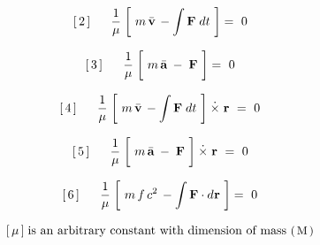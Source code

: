 \documentclass[10pt,fleqn]{article}
\begin{document}
\par \vspace{+0.15em}
\begin{eqnarray*}
\hspace{+1.35em} [\,2\,] \;\;\;\;\;\; \dfrac{1}{\mu} \; \bigg [ \,\, m \, \bar{\mathbf{v}} \, - \int \mathbf{F} \; d\hspace{+0.012em}t \,\, \bigg ] =~ 0
\end{eqnarray*}
\par \vspace{+0.15em}
\begin{eqnarray*}
\hspace{+1.35em} [\,3\,] \;\;\;\;\;\; \dfrac{1}{\mu} \; \bigg [ \,\, m \, \bar{\mathbf{a}} \: - \; \mathbf{F} \,\, \bigg ] =~ 0
\end{eqnarray*}
\par \vspace{+0.15em}
\begin{eqnarray*}
\hspace{+1.35em} [\,4\,] \;\;\;\;\;\; \dfrac{1}{\mu} \; \bigg [ \,\, m \, \bar{\mathbf{v}} \, - \int \mathbf{F} \; d\hspace{+0.012em}t \,\, \bigg ] \hspace{+0.24em}\dot{\times}\hspace{+0.30em} \mathbf{r} ~=~ 0
\end{eqnarray*}
\par \vspace{+0.15em}
\begin{eqnarray*}
\hspace{+1.35em} [\,5\,] \;\;\;\;\;\; \dfrac{1}{\mu} \; \bigg [ \,\, m \, \bar{\mathbf{a}} \: - \; \mathbf{F} \,\, \bigg ] \hspace{+0.24em}\dot{\times}\hspace{+0.30em} \mathbf{r} ~=~ 0
\end{eqnarray*}
\par \vspace{+0.15em}
\begin{eqnarray*}
\hspace{+1.35em} [\,6\,] \;\;\;\;\;\; \dfrac{1}{\mu} \; \bigg [ \,\, m \, f \, c^2 \, - \int \mathbf{F} \cdot d\hspace{+0.036em}\mathbf{r} \,\, \bigg ] =~ 0
\end{eqnarray*}
\par \vspace{+0.33em}
\begin{eqnarray*}
\hspace{+1.35em} [\,\mu\,] \; \textrm{is an arbitrary constant with dimension of mass {\small $( \, \mathrm{M} \, )$}}
\end{eqnarray*}
\end{document}
